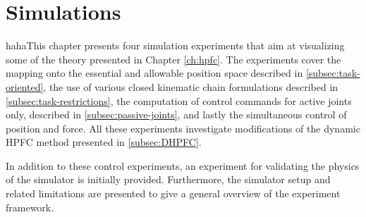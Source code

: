 \chapter{Simulations}\label{ch:results}

hahaThis chapter presents four simulation experiments that aim at visualizing some of the theory presented in Chapter \ref{ch:hpfc}. The experiments cover the mapping onto the essential and allowable position space described in \ref{subsec:task-oriented}, the use of various closed kinematic chain formulations described in \ref{subsec:task-restrictions}, the computation of control commands for active joints only, described in \ref{subsec:passive-joints}, and lastly the simultaneous control of position and force. All these experiments investigate modifications of the dynamic HPFC method presented in \ref{subsec:DHPFC}.

In addition to these control experiments, an experiment for validating the physics of the simulator is initially provided. Furthermore, the simulator setup and related limitations are presented to give a general overview of the experiment framework.











